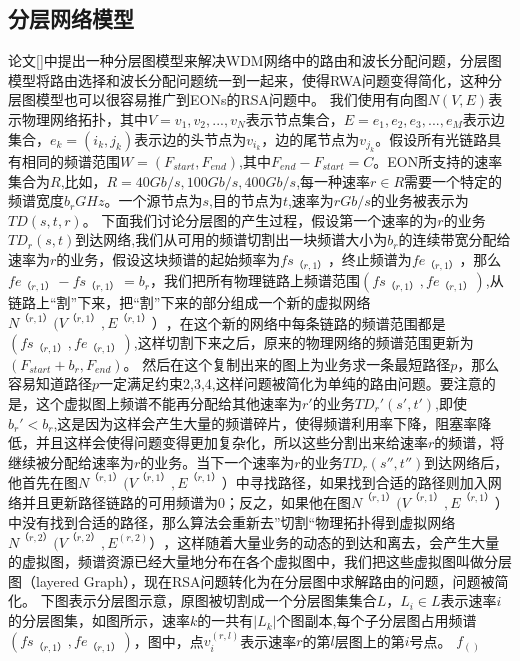 \subsection{分层网络模型}
  论文[]中提出一种分层图模型来解决WDM网络中的路由和波长分配问题，分层图模型将路由选择和波长分配问题统一到一起来，使得RWA问题变得简化，这种分层图模型也可以很容易推广到EONs的RSA问题中。
  我们使用有向图$N(V,E)$表示物理网络拓扑，其中$V={v_1,v_2,...,v_N}$表示节点集合，$E={e_1,e_2,e_3,...,e_M}$表示边集合，$e_k=(i_k,j_k)$表示边的头节点为$v_{i_k}$，边的尾节点为$v_{j_k}$。假设所有光链路具有相同的频谱范围$W=(F_{start},F_{end})$,其中$F_{end}-F_{start}=C$。EON所支持的速率集合为$R$,比如，$R={40Gb/s,100Gb/s,400Gb/s}$,每一种速率$r\in R$需要一个特定的频谱宽度$b_r GHz$。一个源节点为$s$,目的节点为$t$,速率为$r Gb/s$的业务被表示为$TD(s,t,r)$。
  下面我们讨论分层图的产生过程，假设第一个速率的为$r$的业务$TD_r(s,t)$到达网络,我们从可用的频谱切割出一块频谱大小为$b_r$的连续带宽分配给速率为$r$的业务，假设这块频谱的起始频率为$fs_{（r,1）}$，终止频谱为$fe_{（r,1）}$，那么$fe_{（r,1）}-fs_{（r,1）}=b_r$，我们把所有物理链路上频谱范围$(fs_{（r,1）},fe_{（r,1）})$,从链路上“割”下来，把“割”下来的部分组成一个新的虚拟网络$N^{（r,1）} (V^{（r,1）},E^{（r,1）}）$，在这个新的网络中每条链路的频谱范围都是$(fs_{（r,1）},fe_{（r,1）})$,这样切割下来之后，原来的物理网络的频谱范围更新为$(F_{start}+b_r,F_{end})$。
  然后在这个复制出来的图上为业务求一条最短路径$p$，那么容易知道路径$p$一定满足约束2,3,4,这样问题被简化为单纯的路由问题。要注意的是，这个虚拟图上频谱不能再分配给其他速率为$r'$的业务$TD_r'(s',t')$,即使$b_r'<b_r$,这是因为这样会产生大量的频谱碎片，使得频谱利用率下降，阻塞率降低，并且这样会使得问题变得更加复杂化，所以这些分割出来给速率$r$的频谱，将继续被分配给速率为$r$的业务。当下一个速率为$r$的业务$TD_r (s'',t'')$到达网络后，他首先在图$N^{ （r,1）}(V^{（r,1）},E^{（r,1）}）$中寻找路径，如果找到合适的路径则加入网络并且更新路径链路的可用频谱为0；反之，如果他在图$N^{（r,1）} (V^{（r,1）},E^{（r,1）}）$中没有找到合适的路径，那么算法会重新去”切割“物理拓扑得到虚拟网络$N^{（r,2）} (V^{（r,2）},E^{(r,2)}）$，这样随着大量业务的动态的到达和离去，会产生大量的虚拟图，频谱资源已经大量地分布在各个虚拟图中，我们把这些虚拟图叫做分层图（layered Graph），现在RSA问题转化为在分层图中求解路由的问题，问题被简化。
  下图表示分层图示意，原图被切割成一个分层图集集合$L$，$L_i \in L$表示速率$i$的分层图集，如图所示，速率$k$的一共有$|L_k|$个图副本,每个子分层图占用频谱$(fs_{（r,1）},fe_{（r,1）})$，图中，点$v_i^{(r,l)}$表示速率$r$的第$l$层图上的第$i$号点。
$f_{()}$
